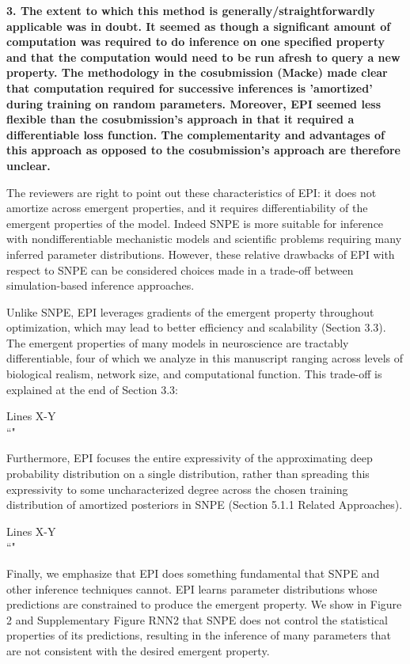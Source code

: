 \documentclass[11pt,a4paper]{article}
\begin{document}
\textbf{3. The extent to which this method is generally/straightforwardly applicable was in doubt. It seemed as though a significant amount of computation was required to do inference on one specified property and that the computation would need to be run afresh to query a new property. The methodology in the cosubmission (Macke) made clear that computation required for successive inferences is 'amortized' during training on random parameters. Moreover, EPI seemed less flexible than the cosubmission's approach in that it required a differentiable loss function. The complementarity and advantages of this approach as opposed to the cosubmission's approach are therefore unclear. } 

The reviewers are right to point out these characteristics of EPI: it does not amortize across emergent properties, and it requires differentiability of the emergent properties of the model. 
Indeed SNPE is more suitable for inference with nondifferentiable mechanistic models and scientific problems requiring many inferred parameter distributions.  
However, these relative drawbacks of EPI with respect to SNPE can be considered choices made in a trade-off between simulation-based inference approaches.  

Unlike SNPE, EPI leverages gradients of the emergent property throughout optimization, which may lead to better efficiency and scalability (Section 3.3).  
The emergent properties of many models in neuroscience are tractably differentiable, four of which we analyze in this manuscript ranging across levels of biological realism, network size, and computational function.
This trade-off is explained at the end of Section 3.3:

\begin{displayquote}
Lines X-Y\\
``"
\end{displayquote}

Furthermore, EPI focuses the entire expressivity of the approximating deep probability distribution on a single distribution, rather than spreading this expressivity to some uncharacterized degree across the chosen training distribution of amortized posteriors in SNPE (Section 5.1.1 Related Approaches).

\begin{displayquote}
Lines X-Y\\
``"
\end{displayquote}
 
Finally, we emphasize that EPI does something fundamental that SNPE and other inference techniques cannot.  EPI learns parameter distributions whose predictions are constrained to produce the emergent property.  We show in Figure 2 and Supplementary Figure RNN2 that SNPE does not control the statistical properties of its predictions, resulting in the inference of many parameters that are not consistent with the desired emergent property.
\end{document}

